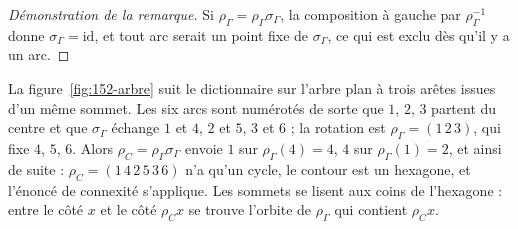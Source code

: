 \begin{proof}[Démonstration de la remarque]
Si $\rho_\Gamma = \rho_\Gamma \sigma_\Gamma$, la composition à gauche par $\rho_\Gamma^{-1}$ donne $\sigma_\Gamma = \mathrm{id}$, et tout arc serait un point fixe de $\sigma_\Gamma$, ce qui est exclu dès qu'il y a un arc.
\end{proof}

La figure~\ref{fig:152-arbre} suit le dictionnaire sur l'arbre plan à trois arêtes issues d'un même sommet. Les six arcs sont numérotés de sorte que $1$, $2$, $3$ partent du centre et que $\sigma_\Gamma$ échange $1$ et $4$, $2$ et $5$, $3$ et $6$ ; la rotation est $\rho_\Gamma = (1\,2\,3)$, qui fixe $4$, $5$, $6$. Alors $\rho_C = \rho_\Gamma\sigma_\Gamma$ envoie $1$ sur $\rho_\Gamma(4) = 4$, $4$ sur $\rho_\Gamma(1) = 2$, et ainsi de suite : $\rho_C = (1\,4\,2\,5\,3\,6)$ n'a qu'un cycle, le contour est un hexagone, et l'énoncé de connexité s'applique. Les sommets se lisent aux coins de l'hexagone : entre le côté $x$ et le côté $\rho_C x$ se trouve l'orbite de $\rho_\Gamma$ qui contient $\rho_C x$.

